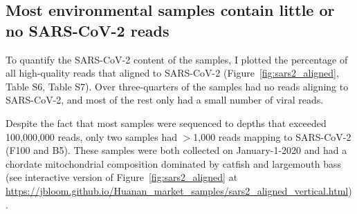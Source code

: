 \documentclass[9pt,twocolumn,twoside]{gsajnl_modified}
\begin{document}
\begin{figure*}
\caption{
Metagenomic composition of sample Q61.
{\bf (A)}
Composition as determined by aligning reads to mitochondrial genomes.
From left to right: composition determined in current study across all chordates, composition determined in current study across all mammals, composition reported in \citet{crits2023genetic} for just mammals shown in the first figure of their report, and composition reported \citet{crits2023genetic} across all mammals in the third supplementary table of their report.
{\bf (B)}
Composition determined in the current study by aligning assembled contigs to the four indicated genomes; this composition is similar to that reported in the third figure of \citet{crits2023genetic}.
See \url{https://jbloom.github.io/Huanan_market_samples/mito_composition.html} for an interactive version of (A) that allows similar pie charts to be viewed for any sample.
See \url{https://jbloom.github.io/Huanan_market_samples/genomic_contig_composition.html} for an interactive version of (B).
\label{fig:composition}
}
\end{figure*}

\subsection{Most environmental samples contain little or no SARS-CoV-2 reads}
To quantify the SARS-CoV-2 content of the samples, I plotted the percentage of all high-quality reads that aligned to SARS-CoV-2 (Figure~\ref{fig:sars2_aligned}, Table S6, Table S7).
Over three-quarters of the samples had no reads aligning to SARS-CoV-2, and most of the rest only had a small number of viral reads.

Despite the fact that most samples were sequenced to depths that exceeded 100,000,000 reads, only two samples had $>$1,000 reads mapping to SARS-CoV-2 (F100 and B5).
These samples were both collected on January-1-2020 and had a chordate mitochondrial composition dominated by catfish and largemouth bass (see interactive version of Figure~\ref{fig:sars2_aligned} at \url{https://jbloom.github.io/Huanan_market_samples/sars2_aligned_vertical.html}).

\begin{figure*}
\caption{
Percentage of high-quality reads that align to SARS-CoV-2 for each sample.
Points are colored according to the date that the sample was collected.
Note the x-axis uses a symlog scale.
See \url{https://jbloom.github.io/Huanan_market_samples/sars2_aligned_vertical.html} for an interactive version of this plot where you can mouseover points for details including the mitochondrial composition of each sample, and select only samples from specific dates or from locations.
\label{fig:sars2_aligned}
}
\end{figure*}
\end{document}
